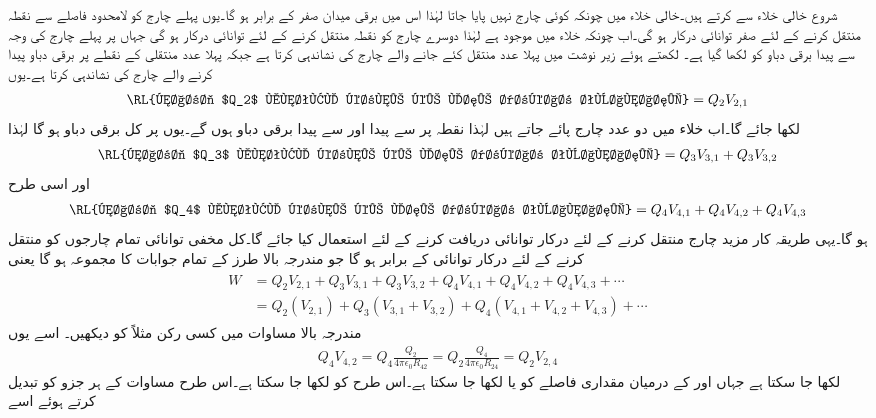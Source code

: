 شروع خالی خلاء سے کرتے ہیں۔خالی خلاء میں چونکہ کوئی چارج نہیں پایا جاتا لہٰذا اس میں برقی میدان صفر کے برابر ہو گا۔یوں پہلے چارج  کو لامحدود فاصلے سے  نقطہ  منتقل کرنے کے لئے صفر توانائی درکار ہو گی۔اب چونکہ خلاء میں  موجود ہے لہٰذا دوسرے چارج  کو  نقطہ  منتقل کرنے کے لئے  توانائی درکار ہو گی جہاں  پر پہلے چارج کی وجہ سے پیدا برقی دباو کو  لکھا گیا ہے۔ لکھتے ہوئے زیر نوشت میں پہلا عدد منتقل کئے جانے والے چارج کی نشاندہی کرتا ہے جبکہ پہلا عدد  منتقلی کے نقطے پر برقی دباو پیدا کرنے والے چارج کی نشاندہی کرتا ہے۔یوں
\begin{align*}
\textup{\RL{چارج $Q_2$ منتقل کرنے کے لئے درکار توانائی}}=Q_2 V_{2,1}
\end{align*}
لکھا جائے گا۔اب خلاء میں دو عدد چارج پائے جاتے ہیں لہٰذا  نقطہ  پر  سے پیدا  اور  سے پیدا  برقی دباو ہوں گے۔یوں  پر کل  برقی دباو ہو گا لہٰذا
\begin{align*}
\textup{\RL{چارج $Q_3$ منتقل کرنے کے لئے درکار توانائی}}=Q_3 V_{3,1} +Q_3 V_{3,2}
\end{align*}
اور اسی طرح
\begin{align*}
\textup{\RL{چارج $Q_4$ منتقل کرنے کے لئے درکار توانائی}}=Q_4 V_{4,1} +Q_4 V_{4,2}+Q_4 V_{4,3}
\end{align*}
ہو گا۔یہی طریقہ کار مزید چارج منتقل کرنے کے لئے درکار توانائی دریافت کرنے کے لئے استعمال کیا جائے گا۔کل مخفی توانائی  تمام چارجوں کو منتقل کرنے کے لئے درکار توانائی کے برابر ہو گا جو مندرجہ بالا طرز کے تمام جوابات کا مجموعہ ہو گا یعنی
\begin{gather}
\begin{aligned}\label{مساوات_توانائی_چارج_کثافت_توانائی_الف}
W&=Q_2 V_{2,1}+Q_3 V_{3,1} +Q_3 V_{3,2}+Q_4 V_{4,1} +Q_4 V_{4,2}+Q_4 V_{4,3}+\cdots\\
&=Q_2(V_{2,1})+Q_3( V_{3,1}+V_{3,2})+Q_4(V_{4,1} +V_{4,2}+V_{4,3})+\cdots
\end{aligned}
\end{gather}
مندرجہ بالا مساوات میں کسی رکن مثلاً  کو دیکھیں۔ اسے یوں
\begin{align*}
Q_4 V_{4,2} = Q_4 \frac{Q_2}{4\pi \epsilon_0 R_{42}}= Q_2 \frac{Q_4}{4\pi \epsilon_0 R_{24}}= Q_2 V_{2,4}
\end{align*}
 لکھا جا سکتا ہے جہاں  اور  کے درمیان مقداری فاصلے کو  یا  لکھا جا سکتا ہے۔اس طرح  کو  لکھا جا سکتا ہے۔اس طرح مساوات  کے ہر جزو کو تبدیل کرتے ہوئے اسے
